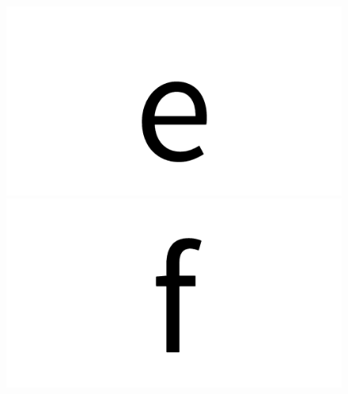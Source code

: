 \documentclass{article}
\begin{document}
\begin{figure}[H]
  \includegraphics[width=\linewidth]{e}
\endminipage\hfill
{}
  \includegraphics[width=\linewidth]{f}
\endminipage\hfill
\end{figure}
\end{document}
